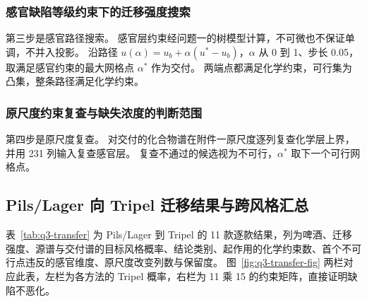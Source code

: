 \subsubsection{感官缺陷等级约束下的迁移强度搜索}

第三步是感官路径搜索。
感官层约束经问题一的树模型计算，不可微也不保证单调，不并入投影。
沿路径 $u(\alpha)=u_b+\alpha(u^*-u_b)$，$\alpha$ 从 0 到 1、步长 0.05，取满足感官约束的最大网格点 $\alpha^*$ 作为交付。
两端点都满足化学约束，可行集为凸集，整条路径满足化学约束。

\subsubsection{原尺度约束复查与缺失浓度的判断范围}

第四步是原尺度复查。
对交付的化合物谱在附件一原尺度逐列复查化学层上界，并用 231 列输入复查感官层。
复查不通过的候选视为不可行，$\alpha^*$ 取下一个可行网格点。

\subsection{Pils/Lager 向 Tripel 迁移结果与跨风格汇总}

表~\ref{tab:q3-transfer} 为 Pils/Lager 到 Tripel 的 11 款逐款结果，列为啤酒、迁移强度、源谱与交付谱的目标风格概率、结论类别、起作用的化学约束数、首个不可行点违反的感官维度、原尺度改变列数与保留度。
图~\ref{fig:q3-transfer-fig} 两栏对应此表，左栏为各方法的 Tripel 概率，右栏为 11 乘 15 的约束矩阵，直接证明缺陷不恶化。

\begin{table}[H]
\centering\small
\caption{Pils/Lager 到 Tripel 逐款迁移}
\label{tab:q3-transfer}
\end{table}

